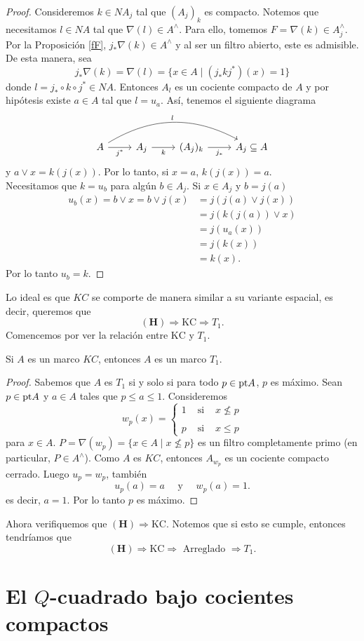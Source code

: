 \begin{proof}
Consideremos $k\in NA_j$ tal que $(A_j)_k$ es compacto. Notemos que necesitamos $l\in NA$ tal que $\nabla(l)\in A^\wedge$. Para ello, tomemos $F=\nabla(k)\in A_j^\wedge$. 
Por la Proposición \ref{fF}, $j_*\nabla(k)\in A^\wedge$ y al ser un filtro abierto, este es admisible. De esta manera, sea 
\[
j_*\nabla(k)=\nabla(l)=\{x\in A\mid (j_*kj^*)(x)=1\}
\]
donde $l=j_*\circ  k\circ j^*\in NA$. Entonces $A_l$ es un cociente compacto de $A$ y por hipótesis existe $a\in A$ tal que $l=u_a$. Así, tenemos el siguiente diagrama 
\[
\begin{tikzcd}
	A \arrow[r, "j^*"'] \arrow[rrr, "l", bend left] & A_j \arrow[r, "k"'] & (A_j)_k \arrow[r, "j_*"'] & A_j\subseteq A
	\end{tikzcd}\]
y $a\vee x=k(j(x))$. Por lo tanto, si $x=a$, $k(j(x))=a$.\\

Necesitamos que $k=u_b$ para algún $b\in A_j$. Si $x\in A_j$ y $b=j(a)$
\[
\begin{split}
u_b(x)= b\vee x= b\vee j(x)& =j(j(a)\vee j(x))\\
& =j(k(j(a))\vee x)\\
& =j(u_a(x))\\
& =j(k(x))\\	
&=k(x).
\end{split}
\]
Por lo tanto $u_b=k$.
\end{proof}

Lo ideal es que $KC$ se comporte de manera similar a su variante espacial, es decir, queremos que 
\[
\mathbf{(H)} \Rightarrow \mathrm{KC} \Rightarrow T_1.
\]
Comencemos por ver la relación entre $\mathrm{KC}$ y $T_1$.

\begin{prop}\label{KCT1}
    Si $A$ es un marco $KC$, entonces $A$ es un marco $T_1$.
\end{prop}

\begin{proof}
Sabemos que $A$ es $T_1$ si y solo si para todo $p\in \mathrm{pt} A$, $p$ es máximo. Sean $p\in \mathrm{pt} A$ y $a\in A$ tales que $p\leq a\leq 1$. Consideremos 
\[
w_p(x)=\left\{\begin{array}{lcc}
1 & \mbox{ si } & x\nleq p\\
\\
p & \mbox{ si } & x\leq p
\end{array}\right.
\]
para $x\in A$. $P=\nabla(w_p)=\{x\in A\mid x\nleq p\}$ es un filtro completamente primo (en particular, $P\in A^\wedge$). Como $A$ es $KC$, entonces $A_{w_p}$ es un cociente compacto cerrado. Luego $u_p=w_p$, también
\[
u_p(a)=a\quad \mbox{ y }\quad w_p(a)=1.
\]
es decir, $a=1$. Por lo tanto $p$ es máximo. 
\end{proof}

Ahora verifiquemos que $\mathbf{(H)} \Rightarrow \mathrm{KC}$. Notemos que si esto se cumple, entonces tendríamos que
\[
\mathbf{(H)} \Rightarrow \mathrm{KC} \Rightarrow \mbox{ Arreglado }\Rightarrow T_1.
\]

\section{El $Q$-cuadrado bajo cocientes compactos}\label{Qcociente}

